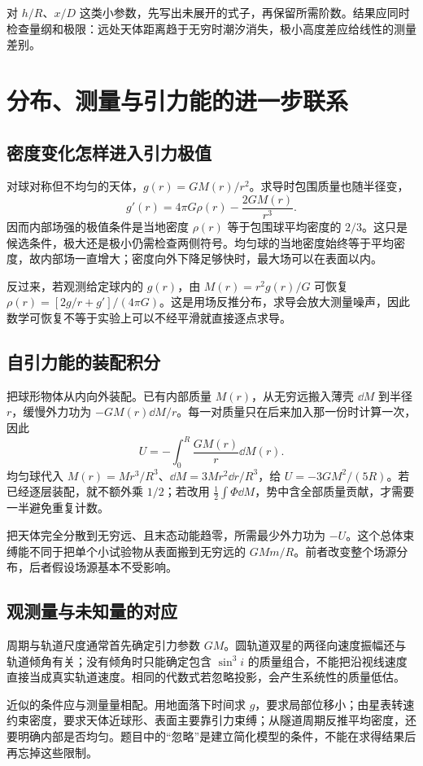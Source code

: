 对 $h/R$、$x/D$ 这类小参数，先写出未展开的式子，再保留所需阶数。结果应同时检查量纲和极限：远处天体距离趋于无穷时潮汐消失，极小高度差应给线性的测量差别。


\section{分布、测量与引力能的进一步联系}
\subsection{密度变化怎样进入引力极值}

  对球对称但不均匀的天体，$g(r)=GM(r)/r^2$。求导时包围质量也随半径变，
  \[g'(r)=4\pi G\rho(r)-\frac{2GM(r)}{r^3}.\]
  因而内部场强的极值条件是当地密度 $\rho(r)$ 等于包围球平均密度的 $2/3$。这只是候选条件，极大还是极小仍需检查两侧符号。均匀球的当地密度始终等于平均密度，故内部场一直增大；密度向外下降足够快时，最大场可以在表面以内。

  反过来，若观测给定球内的 $g(r)$，由 $M(r)=r^2g(r)/G$ 可恢复 $\rho(r)=[2g/r+g']/(4\pi G)$。这是用场反推分布，求导会放大测量噪声，因此数学可恢复不等于实验上可以不经平滑就直接逐点求导。
  
\subsection{自引力能的装配积分}

  把球形物体从内向外装配。已有内部质量 $M(r)$，从无穷远搬入薄壳 $\dd M$ 到半径 $r$，缓慢外力功为 $-GM(r)\dd M/r$。每一对质量只在后来加入那一份时计算一次，因此
  \[U=-\int_0^R\frac{GM(r)}r\dd M(r).\]
  均匀球代入 $M(r)=Mr^3/R^3$、$\dd M=3Mr^2\dd r/R^3$，给 $U=-3GM^2/(5R)$。若已经逐层装配，就不额外乘 $1/2$；若改用 $\tfrac12\int\Phi\dd M$，势中含全部质量贡献，才需要一半避免重复计数。

  把天体完全分散到无穷远、且末态动能趋零，所需最少外力功为 $-U$。这个总体束缚能不同于把单个小试验物从表面搬到无穷远的 $GMm/R$。前者改变整个场源分布，后者假设场源基本不受影响。
  
\subsection{观测量与未知量的对应}

  周期与轨道尺度通常首先确定引力参数 $GM$。圆轨道双星的两径向速度振幅还与轨道倾角有关；没有倾角时只能确定包含 $\sin^3 i$ 的质量组合，不能把沿视线速度直接当成真实轨道速度。相同的代数式若忽略投影，会产生系统性的质量低估。

  近似的条件应与测量量相配。用地面落下时间求 $g$，要求局部位移小；由星表转速约束密度，要求天体近球形、表面主要靠引力束缚；从隧道周期反推平均密度，还要明确内部是否均匀。题目中的“忽略”是建立简化模型的条件，不能在求得结果后再忘掉这些限制。
  

